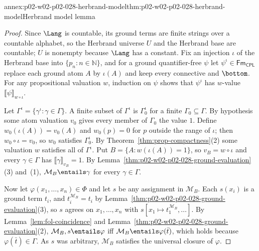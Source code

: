 \begin{annexitem}{annex:p02-w02-p02-028-herbrand-model}{thm:p02-w02-p02-028-herbrand-model}{Herbrand model lemma}
\begin{proof}
Since \(\Lang\) is countable, its ground terms are finite strings over a
countable alphabet, so the Herbrand universe \(U\) and the Herbrand base are
countable; \(U\) is nonempty because \(\Lang\) has a constant.  Fix an
injection \(\iota\) of the Herbrand base into \(\{p_n:n\in\mathbb N\}\), and
for a ground quantifier-free \(\psi\) let \(\psi^\iota\in\mathsf{Fm}_{\mathsf{CPL}}\) replace
each ground atom \(A\) by \(\iota(A)\) and keep every connective and
\(\bottom\).  For any propositional valuation \(w\), induction on \(\psi\)
shows that \(\psi^\iota\) has \(w\)-value \(\llbracket\psi\rrbracket_{w\circ\iota}\).

Let \(\Gamma^\iota=\{\gamma^\iota:\gamma\in\Gamma\}\).  A finite subset of
\(\Gamma^\iota\) is \(\Gamma_0^\iota\) for a finite \(\Gamma_0\subseteq\Gamma\).
By hypothesis some atom valuation \(v_0\) gives every member of \(\Gamma_0\)
the value \(1\).  Define \(w_0(\iota(A))=v_0(A)\) and \(w_0(p)=0\) for \(p\)
outside the range of \(\iota\); then \(w_0\circ\iota=v_0\), so \(w_0\)
satisfies \(\Gamma_0^\iota\).  By Theorem~\ref{thm:prop-compactness}(2) some
valuation \(w\) satisfies all of \(\Gamma^\iota\).  Put
\(B=\{A:w(\iota(A))=1\}\), so \(v_B=w\circ\iota\) and every
\(\gamma\in\Gamma\) has \(\llbracket\gamma\rrbracket_{v_B}=1\).  By
Lemma~\ref{thm:p02-w02-p02-028-ground-evaluation}(3) and~(1),
\(\mathcal M_B\entails\gamma\) for every \(\gamma\in\Gamma\).

Now let \(\varphi(x_1,\ldots,x_n)\in\Phi\) and let \(s\) be any assignment in
\(\mathcal M_B\).  Each \(s(x_i)\) is a ground term \(t_i\), and
\(t_i^{\mathcal M_B}=t_i\) by
Lemma~\ref{thm:p02-w02-p02-028-ground-evaluation}(3), so \(s\) agrees on
\(x_1,\ldots,x_n\) with \(s[x_1\mapsto t_1^{\mathcal M_B},\ldots]\).  By
Lemma~\ref{lem:fol-coincidence} and
Lemma~\ref{thm:p02-w02-p02-028-ground-evaluation}(2),
\(\mathcal M_B,s\entails\varphi\) iff \(\mathcal M_B\entails\varphi(\bar t)\),
which holds because \(\varphi(\bar t)\in\Gamma\).  As \(s\) was arbitrary,
\(\mathcal M_B\) satisfies the universal closure of \(\varphi\).
\end{proof}
\end{annexitem}

